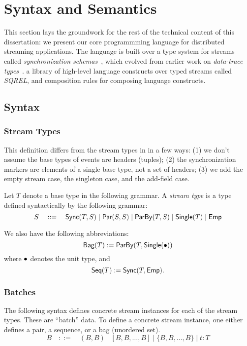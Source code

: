 \section{Syntax and Semantics}

This section lays the groundwork for the rest of the technical content of this dissertation: we present our core programmming language for distributed streaming applications. The language is built over a type system for streams called \emph{synchronization schemas}~, which evolved from earlier work on \emph{data-trace types}~. a library of high-level language constructs over typed streams called \emph{SQREL}, and composition rules for composing language constructs.
\cite{StreamQRE}

\subsection{Syntax}

\subsubsection{Stream Types}

This definition differs from the stream types in  in a few ways: (1) we don't assume the base types of events are headers (tuples); (2) the synchronization markers are elements of a single base type, not a set of headers; (3) we add the empty stream case, the singleton case, and the add-field case.

\begin{definition}
Let $T$ denote a base type in the following grammar.
A \emph{stream type} is a type defined syntactically by the following grammar:
\[
  S \quad ::= \quad
    \mathsf{Sync}({T}, S) \mid
    \mathsf{Par}({S}, {S}) \mid
    \mathsf{ParBy}({T}, S) \mid
    \mathsf{Single}(T) \mid
    \mathsf{Emp}{}
\]
\end{definition}

We also have the following abbreviations:
\[
  \mathsf{Bag}({T}) := \mathsf{ParBy}({T}, \mathsf{Single}(\bullet{}))
\]
where $\bullet{}$ denotes the unit type, and
\[
  \mathsf{Seq}({T}) := \mathsf{Sync}({T}, \mathsf{Emp}{}).
\]

\subsubsection{Batches}

The following syntax defines concrete stream instances for each of the
stream types.
These are ``batch'' data.
To define a concrete stream instance, one either defines a pair, a sequence, or a bag (unordered set).
\[
  B \quad ::= \quad
    (B, B) \mid
    [B, B, \ldots, B] \mid
    \{B, B, \ldots, B\} \mid
    t: T
\]

